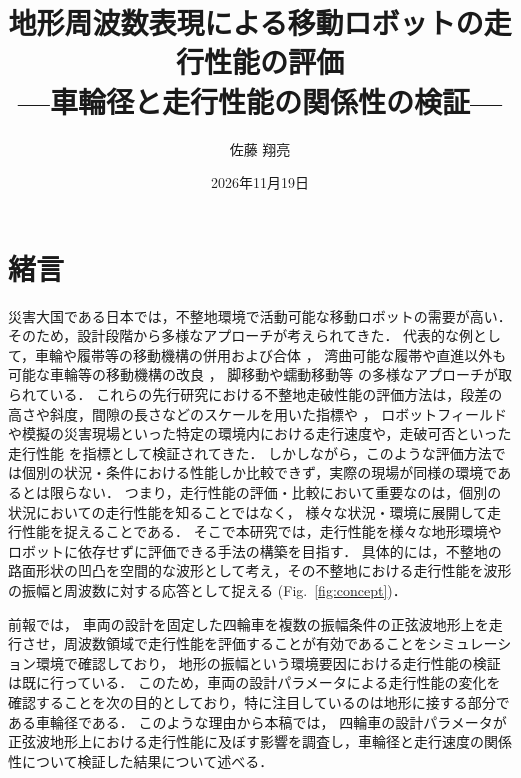 \documentclass[uplatex,dvipdfmx]{jsarticle}
\title{地形周波数表現による移動ロボットの走行性能の評価\\ {\Large ---車輪径と走行性能の関係性の検証---} }
\author{佐藤 翔亮}
\date{2026年11月19日}%
\begin{document}
\maketitle
\thispagestyle{empty}






\section{緒言}
災害大国である日本では，不整地環境で活動可能な移動ロボットの需要が高い．
そのため，設計段階から多様なアプローチが考えられてきた．
代表的な例として，車輪や履帯等の移動機構の併用および合体
\cite{cite:Quince,cite:TITANXX,cite:trackwalker,cite:iRobotPackBot}，
湾曲可能な履帯や直進以外も可能な車輪等の移動機構の改良
\cite{cite:DFC,cite:Mecanum_wheel}，
脚移動や蠕動移動等
\cite{cite:asterisk,cite:harvestman_robot,cite:i_centipod_aqua,cite:K3,cite:six_legged_robot}
の多様なアプローチが取られている．
これらの先行研究における不整地走破性能の評価方法は，段差の高さや斜度，間隙の長さなどのスケールを用いた指標や
\cite{cite:TITANXX,cite:DFC,cite:six_legged_robot,cite:ro-ba}，
ロボットフィールドや模擬の災害現場といった特定の環境内における走行速度や，走破可否といった走行性能
\cite{cite:Quince,cite:trackwalker,cite:i_centipod_aqua}
を指標として検証されてきた．
しかしながら，このような評価方法では個別の状況・条件における性能しか比較できず，実際の現場が同様の環境であるとは限らない．
つまり，走行性能の評価・比較において重要なのは，個別の状況においての走行性能を知ることではなく，
様々な状況・環境に展開して走行性能を捉えることである．
そこで本研究では，走行性能を様々な地形環境やロボットに依存せずに評価できる手法の構築を目指す．
具体的には，不整地の路面形状の凹凸を空間的な波形として考え，その不整地における走行性能を波形の振幅と周波数に対する応答として捉える
(Fig.~\ref{fig:concept})．

前報\cite{cite:myproceedings}では，
車両の設計を固定した四輪車を複数の振幅条件の正弦波地形上を走行させ，周波数領域で走行性能を評価することが有効であることをシミュレーション環境で確認しており，
地形の振幅という環境要因における走行性能の検証は既に行っている．
このため，車両の設計パラメータによる走行性能の変化を確認することを次の目的としており，特に注目しているのは地形に接する部分である車輪径である．
このような理由から本稿では，
四輪車の設計パラメータが正弦波地形上における走行性能に及ぼす影響を調査し，車輪径と走行速度の関係性について検証した結果について述べる．
\end{document}
